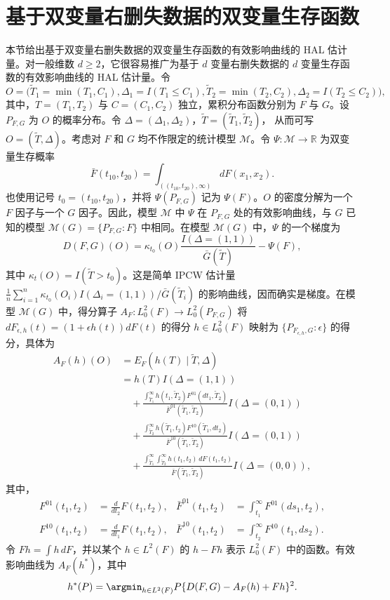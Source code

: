 \section{基于双变量右删失数据的双变量生存函数}

本节给出基于双变量右删失数据的双变量生存函数的有效影响曲线的 HAL 估计量。对一般维数 $d\geq2$，它很容易推广为基于 $d$ 变量右删失数据的 $d$ 变量生存函数的有效影响曲线的 HAL 估计量。令
\[
 O=\bigl(\widetilde T_1=\min(T_1,C_1),\Delta_1=I(T_1\leq C_1),
 \widetilde T_2=\min(T_2,C_2),\Delta_2=I(T_2\leq C_2)\bigr),
\]
其中，$T=(T_1,T_2)$ 与 $C=(C_1,C_2)$ 独立，累积分布函数分别为 $F$ 与 $G$。设 $P_{F,G}$ 为 $O$ 的概率分布。令
$\Delta=(\Delta_1,\Delta_2)$，$\widetilde T=(\widetilde T_1,\widetilde T_2)$，
从而可写 $O=(\widetilde T,\Delta)$。考虑对 $F$ 和 $G$ 均不作限定的统计模型 $\mathcal M$。令 $\Psi:\mathcal M\to\mathbb R$ 为双变量生存概率
\[
 \bar F(t_{10},t_{20})=\int_{((t_{10},t_{20}),\infty)}dF(x_1,x_2).
\]
也使用记号 $t_0=(t_{10},t_{20})$，并将 $\Psi(P_{F,G})$ 记为 $\Psi(F)$。$O$ 的密度分解为一个 $F$ 因子与一个 $G$ 因子。因此，模型 $\mathcal M$ 中 $\Psi$ 在 $P_{F,G}$ 处的有效影响曲线，与 $G$ 已知的模型 $\mathcal M(G)=\{P_{F,G}:F\}$ 中相同。在模型 $\mathcal M(G)$ 中，$\Psi$ 的一个梯度为
\[
 D(F,G)(O)=\kappa_{t_0}(O)\frac{I(\Delta=(1,1))}{\bar G(\widetilde T)}
 -\Psi(F),
\]
其中 $\kappa_t(O)=I(\widetilde T>t_0)$。这是简单 IPCW 估计量
$\frac1n\sum_{i=1}^n\kappa_{t_0}(O_i)I(\Delta_i=(1,1))/\bar G(\widetilde T_i)$
的影响曲线，因而确实是梯度。在模型 $\mathcal M(G)$ 中，得分算子
$A_F:L_0^2(F)\to L_0^2(P_{F,G})$
将 $dF_{\epsilon,h}(t)=(1+\epsilon h(t))dF(t)$ 的得分
$h\in L_0^2(F)$ 映射为 $\{P_{F_{\epsilon,h},G}:\epsilon\}$ 的得分，具体为
\[
 \begin{aligned}
 A_F(h)(O)&=E_F(h(T)\mid\widetilde T,\Delta)\\
 &=h(T)I(\Delta=(1,1))\\
 &\quad+\frac{\int_{\widetilde T_1}^{\infty}
 h(t_1,\widetilde T_2)F^{01}(dt_1,\widetilde T_2)}
 {\bar F^{01}(\widetilde T_1,\widetilde T_2)}I(\Delta=(0,1))\\
 &\quad+\frac{\int_{\widetilde T_2}^{\infty}
 h(\widetilde T_1,t_2)F^{10}(\widetilde T_1,dt_2)}
 {\bar F^{10}(\widetilde T_1,\widetilde T_2)}I(\Delta=(0,1))\\
 &\quad+\frac{\int_{\widetilde T_1}^{\infty}\int_{\widetilde T_2}^{\infty}
 h(t_1,t_2)\,dF(t_1,t_2)}
 {\bar F(\widetilde T_1,\widetilde T_2)}I(\Delta=(0,0)),
 \end{aligned}
\]
其中，
\[
 \begin{aligned}
 F^{01}(t_1,t_2)&=\frac{d}{dt_2}F(t_1,t_2),&
 \bar F^{01}(t_1,t_2)&=\int_{t_1}^{\infty}F^{01}(ds_1,t_2),\\
 F^{10}(t_1,t_2)&=\frac{d}{dt_1}F(t_1,t_2),&
 \bar F^{10}(t_1,t_2)&=\int_{t_2}^{\infty}F^{10}(t_1,ds_2).
 \end{aligned}
\]
令 $Fh=\int h\,dF$，并以某个 $h\in L^2(F)$ 的 $h-Fh$ 表示 $L_0^2(F)$ 中的函数。有效影响曲线为 $A_F(h^*)$，其中
\[
 h^*(P)=\argmin_{h\in L^2(F)}P\{D(F,G)-A_F(h)+Fh\}^2.
\]

